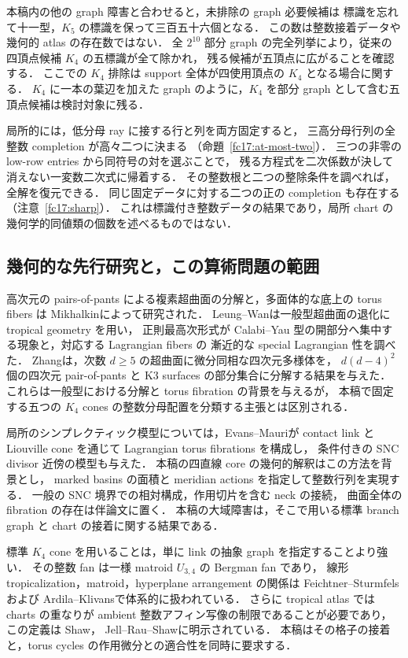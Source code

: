 本稿内の他の graph 障害と合わせると，未排除の graph 必要候補は
標識を忘れて十一型，$K_5$ の標識を保って三百五十六個となる．
この数は整数接着データや幾何的 atlas の存在数ではない．
全 $2^{10}$ 部分 graph の完全列挙により，従来の四頂点候補 $K_4$ の五標識が全て除かれ，
残る候補が五頂点に広がることを確認する．
ここでの $K_4$ 排除は support 全体が四使用頂点の $K_4$ となる場合に関する．
$K_4$ に一本の葉辺を加えた graph のように，$K_4$ を部分 graph として含む五頂点候補は検討対象に残る．

局所的には，低分母 ray に接する行と列を両方固定すると，
三高分母行列の全整数 completion が高々二つに決まる
（命題~\ref{fc17:at-most-two}）．
三つの非零の low-row entries から同符号の対を選ぶことで，
残る方程式を二次係数が決して消えない一変数二次式に帰着する．
その整数根と二つの整除条件を調べれば，全解を復元できる．
同じ固定データに対する二つの正の completion も存在する
（注意~\ref{fc17:sharp}）．
これは標識付き整数データの結果であり，局所 chart の幾何学的同値類の個数を述べるものではない．

\subsection{幾何的な先行研究と，この算術問題の範囲}

高次元の pairs-of-pants による複素超曲面の分解と，多面体的な底上の torus fibers は
Mikhalkin\cite[Theorems~1 and~1$'$]{Mikhalkin}によって研究された．
Leung--Wan\cite{LeungWan}は一般型超曲面の退化に tropical geometry を用い，
正則最高次形式が Calabi--Yau 型の開部分へ集中する現象と，対応する Lagrangian fibers の
漸近的な special Lagrangian 性を調べた．
Zhang\cite[Theorem~1.1]{Zhang}は，次数 $d\ge5$ の超曲面に微分同相な四次元多様体を，
$d(d-4)^2$ 個の四次元 pair-of-pants と K3 surfaces の部分集合に分解する結果を与えた．
これらは一般型における分解と torus fibration の背景を与えるが，
本稿で固定する五つの $K_4$ cones の整数分母配置を分類する主張とは区別される．

局所のシンプレクティック模型については，Evans--Mauri\cite{EM}が
contact link と Liouville cone を通じて Lagrangian torus fibrations を構成し，
条件付きの SNC divisor 近傍の模型も与えた．
本稿の四直線 core の幾何的解釈はこの方法を背景とし，
marked basins の面積と meridian actions を指定して整数行列を実現する．
一般の SNC 境界での相対構成，作用切片を含む neck の接続，
曲面全体の fibration の存在は伴論文\cite{SurfaceGeometry}に置く．
本稿の大域障害は，そこで用いる標準 branch graph と chart の接着に関する結果である．

標準 $K_4$ cone を用いることは，単に link の抽象 graph を指定することより強い．
その整数 fan は一様 matroid $U_{3,4}$ の Bergman fan であり，
線形 tropicalization，matroid，hyperplane arrangement の関係は
Feichtner--Sturmfels\cite{FeichtnerSturmfels}および
Ardila--Klivans\cite{ArdilaKlivans}で体系的に扱われている．
さらに tropical atlas では charts の重なりが ambient 整数アフィン写像の制限であることが必要であり，
この定義は Shaw\cite[Definition~3.1]{ShawSurfaces}，
Jell--Rau--Shaw\cite[Definitions~2.1 and~5.1]{JellRauShaw}に明示されている．
本稿はその格子の接着と，torus cycles の作用微分との適合性を同時に要求する．

